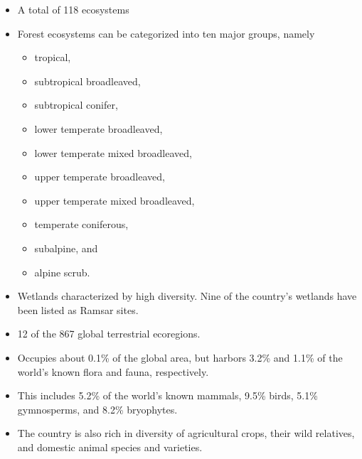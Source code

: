 \documentclass[
  ignorenonframetext,
  aspectratio=169]{beamer}
\providecommand{\tightlist}{%
  \setlength{\itemsep}{0pt}\setlength{\parskip}{0pt}}
\begin{document}
\begin{frame}{}
\protect\hypertarget{section-7}{}
\begin{itemize}
\tightlist
\item
  A total of 118 ecosystems
\item
  Forest ecosystems can be categorized into ten major groups, namely

  \begin{itemize}
  \tightlist
  \item
    tropical,
  \item
    subtropical broadleaved,
  \item
    subtropical conifer,
  \item
    lower temperate broadleaved,
  \item
    lower temperate mixed broadleaved,
  \item
    upper temperate broadleaved,
  \item
    upper temperate mixed broadleaved,
  \item
    temperate coniferous,
  \item
    subalpine, and
  \item
    alpine scrub.
  \end{itemize}
\end{itemize}
\end{frame}

\begin{frame}{}
\protect\hypertarget{section-8}{}
\begin{itemize}
\tightlist
\item
  Wetlands characterized by high diversity. Nine of the country's
  wetlands have been listed as Ramsar sites.
\item
  12 of the 867 global terrestrial ecoregions.
\item
  Occupies about 0.1\% of the global area, but harbors 3.2\% and 1.1\%
  of the world's known flora and fauna, respectively.
\item
  This includes 5.2\% of the world's known mammals, 9.5\% birds, 5.1\%
  gymnosperms, and 8.2\% bryophytes.
\item
  The country is also rich in diversity of agricultural crops, their
  wild relatives, and domestic animal species and varieties.
\end{itemize}
\end{frame}
\end{document}
